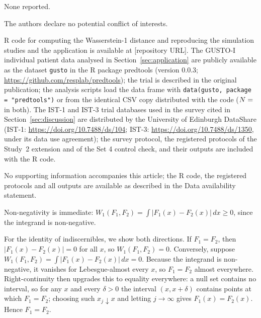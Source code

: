 \documentclass[AMA,Times1COL]{WileyNJDv5}
\begin{document}

None reported.


The authors declare no potential conflict of interests.


R code for computing the Wasserstein-1 distance and reproducing the simulation studies and the application is available at [repository URL]. The GUSTO-I individual patient data analysed in Section~\ref{sec:application} are publicly available as the dataset \texttt{gusto} in the R package predtools (version 0.0.3; \url{https://github.com/resplab/predtools}); the trial is described in the original publication;\cite{gusto1993} the analysis scripts load the data frame with \texttt{data(gusto, package = "predtools")} or from the identical CSV copy distributed with the code ($N = \numval{gustoN}$ in both). The IST-1 and IST-3 trial databases used in the survey cited in Section~\ref{sec:discussion} are distributed by the University of Edinburgh DataShare (IST-1: \url{https://doi.org/10.7488/ds/104}; IST-3: \url{https://doi.org/10.7488/ds/1350}, under its data use agreement); the survey protocol, the registered protocols of the Study~2 extension and of the Set 4 control check, and their outputs are included with the R code.




No supporting information accompanies this article; the R code, the registered protocols and all outputs are available as described in the Data availability statement.

\appendix



Non-negativity is immediate: $W_1(F_1, F_2) = \int |F_1(x) - F_2(x)| \, dx \geq 0$, since the integrand is non-negative.

For the identity of indiscernibles, we show both directions. If $F_1 = F_2$, then $|F_1(x) - F_2(x)| = 0$ for all $x$, so $W_1(F_1, F_2) = 0$. Conversely, suppose $W_1(F_1, F_2) = \int |F_1(x) - F_2(x)| \, dx = 0$. Because the integrand is non-negative, it vanishes for Lebesgue-almost every $x$, so $F_1 = F_2$ almost everywhere. Right-continuity then upgrades this to equality everywhere: a null set contains no interval, so for any $x$ and every $\delta > 0$ the interval $(x, x + \delta)$ contains points at which $F_1 = F_2$; choosing such $x_j \downarrow x$ and letting $j \to \infty$ gives $F_1(x) = F_2(x)$. Hence $F_1 = F_2$.
\end{document}
